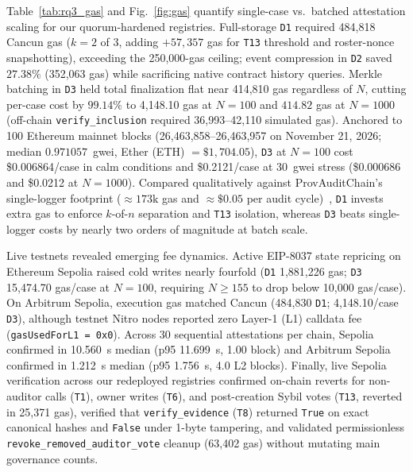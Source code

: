 \documentclass[conference]{IEEEtran}
\begin{document}
Table~\ref{tab:rq3_gas} and Fig.~\ref{fig:gas} quantify single-case vs.\ batched attestation scaling for our quorum-hardened registries. Full-storage \texttt{D1} required 484,818 Cancun gas ($k=2$ of $3$, adding $+57{,}357$ gas for \texttt{T13} threshold and roster-nonce snapshotting), exceeding the 250,000-gas ceiling; event compression in \texttt{D2} saved $27.38\%$ (352,063 gas) while sacrificing native contract history queries. Merkle batching in \texttt{D3} held total finalization flat near 414,810 gas regardless of $N$, cutting per-case cost by $99.14\%$ to 4,148.10 gas at $N=100$ and $414.82$ gas at $N=1000$ (off-chain \texttt{verify\_inclusion} required 36,993--42,110 simulated gas). Anchored to 100 Ethereum mainnet blocks (26,463,858--26,463,957 on November 21, 2026; median $0.971057$~gwei, Ether (ETH) $=\$1{,}704.05$), \texttt{D3} at $N=100$ cost \$0.006864/case in calm conditions and \$0.2121/case at 30~gwei stress (\$0.000686 and \$0.0212 at $N=1000$). Compared qualitatively against ProvAuditChain's single-logger footprint ($\approx 173\text{k}$ gas and $\approx\$0.05$ per audit cycle)~\cite{akor2025provauditchain}, \texttt{D1} invests extra gas to enforce $k$-of-$n$ separation and \texttt{T13} isolation, whereas \texttt{D3} beats single-logger costs by nearly two orders of magnitude at batch scale.

Live testnets revealed emerging fee dynamics. Active EIP-8037 state repricing on Ethereum Sepolia raised cold writes nearly fourfold (\texttt{D1} 1,881,226 gas; \texttt{D3} 15,474.70 gas/case at $N=100$, requiring $N \ge 155$ to drop below 10,000 gas/case). On Arbitrum Sepolia, execution gas matched Cancun (484,830 \texttt{D1}; 4,148.10/case \texttt{D3}), although testnet Nitro nodes reported zero Layer-1 (L1) calldata fee (\texttt{gasUsedForL1 = 0x0}). Across 30 sequential attestations per chain, Sepolia confirmed in 10.560~s median (p95 11.699~s, 1.00 block) and Arbitrum Sepolia confirmed in 1.212~s median (p95 1.756~s, 4.0 L2 blocks). Finally, live Sepolia verification across our redeployed registries confirmed on-chain reverts for non-auditor calls (\texttt{T1}), owner writes (\texttt{T6}), and post-creation Sybil votes (\texttt{T13}, reverted in 25,371 gas), verified that \texttt{verify\_evidence} (\texttt{T8}) returned \texttt{True} on exact canonical hashes and \texttt{False} under 1-byte tampering, and validated permissionless \texttt{revoke\_\allowbreak removed\_\allowbreak auditor\_\allowbreak vote} cleanup (63,402 gas) without mutating main governance counts.
\end{document}
